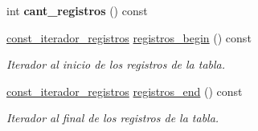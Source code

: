 \begin{DoxyCompactItemize}
\item 
\hypertarget{classTabla_ae25724a86075dd5121b07446c92e94c6}{int {\bfseries cant\-\_\-registros} () const }\label{classTabla_ae25724a86075dd5121b07446c92e94c6}

\item 
\hyperlink{classTabla_1_1const__iterador__registros}{const\-\_\-iterador\-\_\-registros} \hyperlink{classTabla_aafc1aedd4c2c222387591c3b772d56a9}{registros\-\_\-begin} () const 
\begin{DoxyCompactList}\small\item\em Iterador al inicio de los registros de la tabla. \end{DoxyCompactList}\item 
\hyperlink{classTabla_1_1const__iterador__registros}{const\-\_\-iterador\-\_\-registros} \hyperlink{classTabla_ac736bbd3065cc25c36ef258fcddaea50}{registros\-\_\-end} () const 
\begin{DoxyCompactList}\small\item\em Iterador al final de los registros de la tabla. \end{DoxyCompactList}\end{DoxyCompactItemize}
